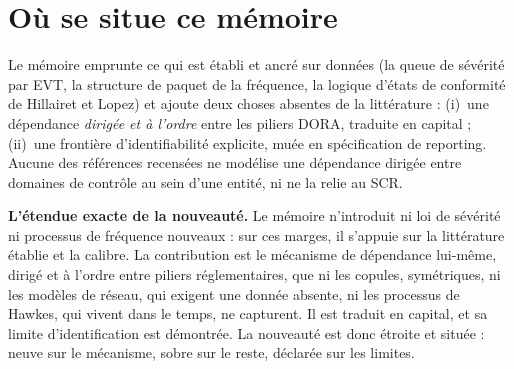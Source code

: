 \section{Où se situe ce mémoire}

Le mémoire emprunte ce qui est établi et ancré sur données (la queue de sévérité par
EVT, la structure de paquet de la fréquence, la logique d'états de conformité de Hillairet et
Lopez) et ajoute deux choses absentes de la littérature : (i)~une dépendance
\emph{dirigée et à l'ordre} entre les piliers DORA, traduite en
capital ; (ii)~une frontière d'identifiabilité explicite, muée en spécification de
reporting. Aucune des références recensées ne modélise une dépendance dirigée entre domaines
de contrôle au sein d'une entité, ni ne la relie au SCR.

\begin{cle}
\textbf{L'étendue exacte de la nouveauté.} Le mémoire n'introduit ni loi de sévérité ni
processus de fréquence nouveaux : sur ces marges, il s'appuie sur la littérature établie et la
calibre. La contribution est le mécanisme de dépendance lui-même, dirigé et à l'ordre entre
piliers réglementaires, que ni les copules, symétriques, ni les modèles de réseau, qui exigent
une donnée absente, ni les processus de Hawkes, qui vivent dans le temps, ne capturent. Il est
traduit en capital, et sa limite d'identification est démontrée. La nouveauté est donc étroite
et située : neuve sur le mécanisme, sobre sur le reste, déclarée sur les limites.
\end{cle}

\nocite{BohmeKataria2006, HerathHerath2011, HillairetLopez2021,
  HillairetLopezDOultremontSpoorenberg2022, XuHua2017, Baldwin2017,
  BessyRolandBoumezouedHillairet2021, BoumezouedCherkaouiHillairet2023,
  HillairetReveillacRosenbaum2021, Peng2016, Edwards2016, LuZhangZhu2024,
  FarkasLopezThomas2021, Vasicek2002, Leontief1936}


